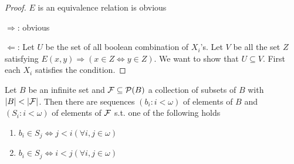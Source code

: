 \documentclass[11pt]{article}
\begin{document}
\begin{proof}
\(E\) is an equivalence relation is obvious

\(\Rightarrow\): obvious

\(\Leftarrow\): Let \(U\) be the set of all boolean combination of \(X_i\)'s. Let \(V\) be all the set \(Z\)
satisfying \(E(x,y)\Rightarrow(x\in Z\Leftrightarrow y\in Z)\). We want to show that \(U\subseteq V\). First each \(X_i\) satisfies
the condition.
\end{proof}

\begin{theorem}
Let \(B\) be an infinite set and \(\mathcal{F}\subseteq\mathcal{P}(B)\) a collection of subsets of \(B\)
with \(\abs{B}<\abs{\calf}\). Then there are sequences \((b_i:i<\omega)\) of elements of \(B\)
and \((S_i:i<\omega)\) of elements of \(\mathcal{F}\) s.t. one of the following holds
\begin{enumerate}
\item \(b_i\in S_j\Leftrightarrow j<i(\forall i,j\in\omega)\)
\item \(b_i\in S_j\Leftrightarrow i<j(\forall i,j\in\omega)\)
\end{enumerate}
\end{theorem}
\end{document}
